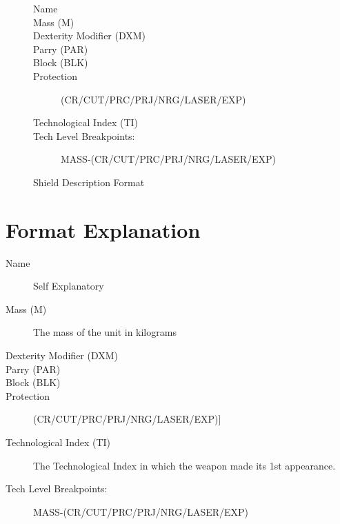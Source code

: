 \begin{figure}[hb]
\centering
\caption{Shield Description Format}
	\begin{description}
		\item[Name]
		\item[Mass (M)]
		\item[Dexterity Modifier (DXM)]
		\item[Parry (PAR)]
		\item[Block (BLK)]
		\item[Protection]
		(CR/CUT/PRC/PRJ/NRG/LASER/EXP)
		\item[Technological Index (TI)]
		\item[Tech Level Breakpoints:]
		MASS-(CR/CUT/PRC/PRJ/NRG/LASER/EXP)
	\end{description}                            
\end{figure}

\section{Format Explanation}

\begin{description}
	\item[Name]
	Self Explanatory
	\item[Mass (M)]
	The mass of the unit in kilograms
	\item[Dexterity Modifier (DXM)]
	\item[Parry (PAR)]
	\item[Block (BLK)]
	\item[Protection]
	(CR/CUT/PRC/PRJ/NRG/LASER/EXP)]
	\item[Technological Index (TI)]
	The Technological Index in which the weapon made its 1st appearance.
	\item[Tech Level Breakpoints:]
	MASS-(CR/CUT/PRC/PRJ/NRG/LASER/EXP)
\end{description}


